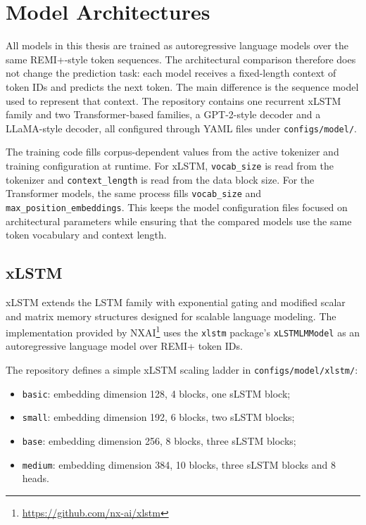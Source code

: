 \section{Model Architectures}

All models in this thesis are trained as autoregressive language models over
the same REMI+-style token sequences. The architectural comparison therefore
does not change the prediction task: each model receives a fixed-length context
of token IDs and predicts the next token. The main difference is the sequence
model used to represent that context. The repository contains one recurrent
xLSTM family and two Transformer-based families, a GPT-2-style decoder and a
LLaMA-style decoder, all configured through YAML files under
\verb|configs/model/|.

The training code fills corpus-dependent values from the active tokenizer and
training configuration at runtime. For xLSTM, \verb|vocab_size| is read from the
tokenizer and \verb|context_length| is read from the data block size. For the
Transformer models, the same process fills \verb|vocab_size| and
\verb|max_position_embeddings|. This keeps the model configuration files focused
on architectural parameters while ensuring that the compared models use the same
token vocabulary and context length.

\subsection{xLSTM}

xLSTM \citep{beckXLSTMExtendedLong2024} extends the LSTM
\citep{hochreiterLongShortTermMemory1997} family with exponential gating and
modified scalar and matrix memory structures designed for scalable language
modeling. The implementation provided by
NXAI\footnote{\url{https://github.com/nx-ai/xlstm}} uses the \verb|xlstm|
package's \verb|xLSTMLMModel| as an autoregressive language model over REMI+
token IDs.

The repository defines a simple xLSTM scaling ladder in
\verb|configs/model/xlstm/|:
\begin{itemize}
	\item \verb|basic|: embedding dimension 128, 4 blocks, one sLSTM block;
	\item \verb|small|: embedding dimension 192, 6 blocks, two sLSTM blocks;
	\item \verb|base|: embedding dimension 256, 8 blocks, three sLSTM blocks;
	\item \verb|medium|: embedding dimension 384, 10 blocks, three sLSTM blocks and 8 heads.
\end{itemize}

